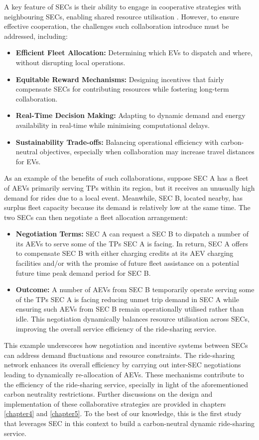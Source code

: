 A key feature of SECs is their ability to engage in cooperative strategies with neighbouring SECs, enabling shared resource utilisation \cite{peterson2020integrating}. However, to ensure effective cooperation, the challenges such collaboration introduce must be addressed, including:
\begin{itemize}
    \item \textbf{Efficient Fleet Allocation:} Determining which EVs to dispatch and where, without disrupting local operations.
    \item \textbf{Equitable Reward Mechanisms:} Designing incentives that fairly compensate SECs for contributing resources while fostering long-term collaboration.
    \item \textbf{Real-Time Decision Making:} Adapting to dynamic demand and energy availability in real-time while minimising computational delays.
    \item \textbf{Sustainability Trade-offs:} Balancing operational efficiency with carbon-neutral objectives, especially when collaboration may increase travel distances for EVs.
\end{itemize}

As an example of the benefits of such collaborations, suppose SEC A has a fleet of AEVs primarily serving TPs within its region, but it receives an unusually high demand for rides due to a local event. Meanwhile, SEC B, located nearby, has surplus fleet capacity because its demand is relatively low at the same time. The two SECs can then negotiate a fleet allocation arrangement:
\begin{itemize}
    \item \textbf{Negotiation Terms:} SEC A can request a SEC B to dispatch a number of its AEVs to serve some of the TPs SEC A is facing. In return, SEC A offers to compensate SEC B with either charging credits at its AEV charging facilities and/or with the promise of future fleet assistance on a potential future time peak demand period for SEC B.
    \item \textbf{Outcome:} A number of AEVs from SEC B temporarily operate serving some of the TPs SEC A is facing reducing unmet trip demand in SEC A while ensuring such AEVs from SEC B remain operationally utilised rather than idle. This negotiation dynamically balances resource utilisation across SECs, improving the overall service efficiency of the ride-sharing service.
\end{itemize}

This example underscores how negotiation and incentive systems between SECs can address demand fluctuations and resource constraints. The ride-sharing network enhances its overall efficiency by carrying out inter-SEC negotiations leading to dynamically re-allocation of AEVs. These mechanisms contribute to the efficiency of the ride-sharing service, specially in light of the aforementioned carbon neutrality restrictions. Further discussions on the design and implementation of these collaborative strategies are provided in chapters \ref{chapter4} and \ref{chapter5}. To the best of our knowledge, this is the first study that leverages SEC in this context to build a carbon-neutral dynamic ride-sharing service. 

